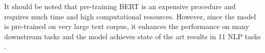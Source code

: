 It should be noted that pre-training \ac{BERT} is an expensive procedure and requires much time and high computational resources. However, since the model is pre-trained on very large text corpus, it enhances the performance on many downstream tasks and the model achieves state of the art results in 11 \ac{NLP} tasks \cite{devlin2018bert}.





